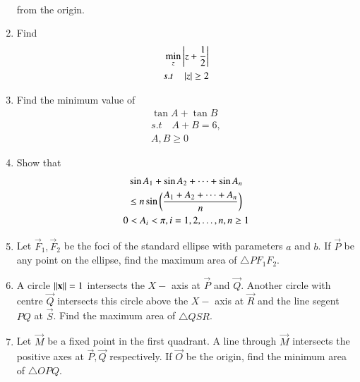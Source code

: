 \documentclass[journal,12pt,twocolumn]{IEEEtran}
\begin{document}
\begin{enumerate}[label=\arabic*.]
\begin{align}
\end{align}
%
from the origin.
\item Find 
\begin{align}
\min_{z}\left\vert z+\frac{1}{2}\right\vert
\\
s.t\quad \left\vert z\right\vert \ge 2
\end{align}
\item Find  the minimum value of
\begin{align}
\tan A + \tan B
\\
s.t \quad A+B=6,
\\
A, B \ge 0
\end{align}
\item Show that 
\begin{multline}
\sin A_1+\sin A_2 + \dots + \sin A_n 
\\
\le n \sin \left(\frac{A_1+A_2+\dots + A_n}{n}\right)
\\
0 < A_i < \pi, i = 1, 2, \dots , n, n \ge 1
\end{multline}
\item Let $\vec{F}_1, \vec{F}_2$ be the foci of the standard ellipse with parameters $a$ and $b$.  If $\vec{P}$ be any point on the ellipse, find the maximum area of $\triangle PF_1F_2$.
\item A circle $\left\Vert\mathbf{x}\right\Vert=1$ intersects the $X-$ axis at $\vec{P}$ and $\vec{Q}$.  Another circle with centre $\vec{Q}$ intersects this circle above the $X-$ axis at $\vec{R}$ and the line segent $PQ$ at $\vec{S}$.  Find the maximum area of $\triangle QSR$.
\item Let $\vec{M}$ be a fixed point in the first quadrant.   A line through $\vec{M}$ intersects the positive axes at $\vec{P}, \vec{Q}$ respectively. If $\vec{O}$ be the origin, find the minimum area of $\triangle OPQ$.
\end{enumerate}
\end{document}
